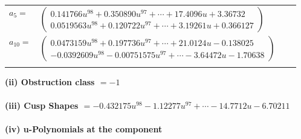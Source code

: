 \documentclass[1p]{elsarticle_modified}
\theoremstyle{definition}
\begin{document}
\begin{tabular}{m{7pt} m{180pt} m{7pt} m{180pt} }
\flushright $a_{5}=$&$\begin{pmatrix}0.141766 u^{98}+0.350890 u^{97}+\cdots+17.4096 u+3.36732\\0.0519563 u^{98}+0.120722 u^{97}+\cdots+3.19261 u+0.366127\end{pmatrix}$ \\
\flushright $a_{10}=$&$\begin{pmatrix}0.0473159 u^{98}+0.197736 u^{97}+\cdots+21.0124 u-0.138025\\-0.0392609 u^{98}-0.00751575 u^{97}+\cdots-3.64472 u-1.70638\end{pmatrix}$\\&\end{tabular}
\flushleft \textbf{(ii) Obstruction class $= -1$}\\~\\
\flushleft \textbf{(iii) Cusp Shapes $= -0.432175 u^{98}-1.12277 u^{97}+\cdots-14.7712 u-6.70211$}\\~\\
\newpage\renewcommand{\arraystretch}{1}
\flushleft \textbf{(iv) u-Polynomials at the component}\newline \\
\end{document}
